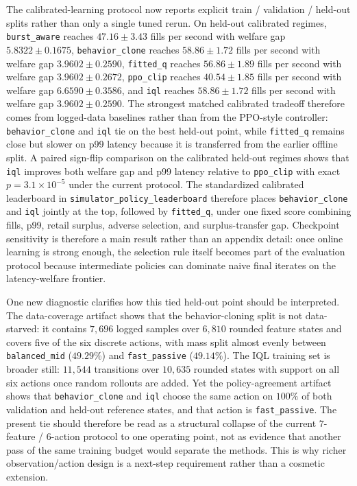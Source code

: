 \documentclass[11pt]{article}
\begin{document}
The calibrated-learning protocol now reports explicit train / validation / held-out splits rather than only a single tuned rerun. On held-out calibrated regimes, \texttt{burst\_aware} reaches $47.16 \pm 3.43$ fills per second with welfare gap $5.8322 \pm 0.1675$, \texttt{behavior\_clone} reaches $58.86 \pm 1.72$ fills per second with welfare gap $3.9602 \pm 0.2590$, \texttt{fitted\_q} reaches $56.86 \pm 1.89$ fills per second with welfare gap $3.9602 \pm 0.2672$, \texttt{ppo\_clip} reaches $40.54 \pm 1.85$ fills per second with welfare gap $6.6590 \pm 0.3586$, and \texttt{iql} reaches $58.86 \pm 1.72$ fills per second with welfare gap $3.9602 \pm 0.2590$. The strongest matched calibrated tradeoff therefore comes from logged-data baselines rather than from the PPO-style controller: \texttt{behavior\_clone} and \texttt{iql} tie on the best held-out point, while \texttt{fitted\_q} remains close but slower on p99 latency because it is transferred from the earlier offline split. A paired sign-flip comparison on the calibrated held-out regimes shows that \texttt{iql} improves both welfare gap and p99 latency relative to \texttt{ppo\_clip} with exact $p=3.1 \times 10^{-5}$ under the current protocol. The standardized calibrated leaderboard in \texttt{simulator\_policy\_leaderboard} therefore places \texttt{behavior\_clone} and \texttt{iql} jointly at the top, followed by \texttt{fitted\_q}, under one fixed score combining fills, p99, retail surplus, adverse selection, and surplus-transfer gap. Checkpoint sensitivity is therefore a main result rather than an appendix detail: once online learning is strong enough, the selection rule itself becomes part of the evaluation protocol because intermediate policies can dominate naive final iterates on the latency-welfare frontier.

One new diagnostic clarifies how this tied held-out point should be interpreted. The data-coverage artifact shows that the behavior-cloning split is not data-starved: it contains $7{,}696$ logged samples over $6{,}810$ rounded feature states and covers five of the six discrete actions, with mass split almost evenly between \texttt{balanced\_mid} ($49.29\%$) and \texttt{fast\_passive} ($49.14\%$). The IQL training set is broader still: $11{,}544$ transitions over $10{,}635$ rounded states with support on all six actions once random rollouts are added. Yet the policy-agreement artifact shows that \texttt{behavior\_clone} and \texttt{iql} choose the same action on $100\%$ of both validation and held-out reference states, and that action is \texttt{fast\_passive}. The present tie should therefore be read as a structural collapse of the current $7$-feature / $6$-action protocol to one operating point, not as evidence that another pass of the same training budget would separate the methods. This is why richer observation/action design is a next-step requirement rather than a cosmetic extension.
\end{document}
